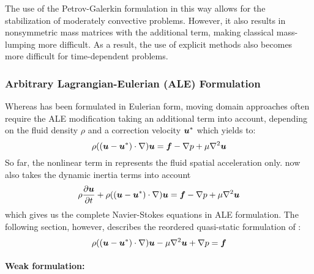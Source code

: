 The use of the Petrov-Galerkin formulation in this way allows for the stabilization of moderately convective problems. However, it also results in nonsymmetric mass matrices with the additional term, making classical mass-lumping more difficult. As a result, the use of explicit methods also becomes more difficult for time-dependent problems. 


\subsubsection{Arbitrary Lagrangian-Eulerian (ALE) Formulation}
Whereas  has been formulated in Eulerian form, moving domain approaches often require the ALE modification taking an additional term into account, depending on the fluid density $\rho$ and a correction velocity $\vect{u}^*$ which yields to:
\begin{equation}
    \rho((\vect{u}-\vect{u}^*)\cdot\grad)\vect{u}=\vect{f}-\grad{p}+\mu\laplacian{\vect{u}}
  \label{eqn:NavierStokesequationALE}
\end{equation}
So far, the nonlinear term in  represents the fluid spatial acceleration only.  now also takes the dynamic inertia terms into account
\begin{equation}
    \rho\delby{\vect{u}}{t}+ \rho((\vect{u}-\vect{u}^*)\cdot\grad)\vect{u}=\vect{f}-\grad{p}+\mu\laplacian{\vect{u}}
  \label{eqn:NavierStokesequation2}
\end{equation}
which gives us the complete Navier-Stokes equations in ALE formulation.
The following section, however, describes the reordered quasi-static formulation of  :
\begin{equation}
\rho((\vect{u}-\vect{u}^*)\cdot\grad)\vect{u}-\mu\laplacian{\vect{u}}+\grad{p}=\vect{f}
  \label{eqn:NavierStokesequationALE2}
\end{equation}

\paragraph{Weak formulation:}

